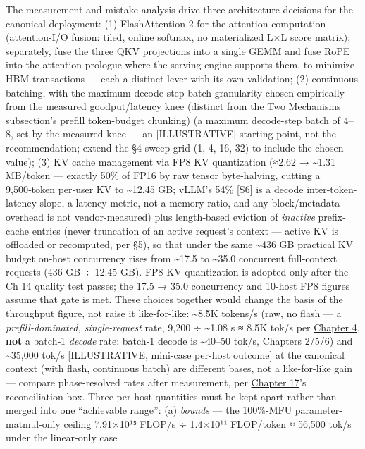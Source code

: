 The measurement and mistake analysis drive three architecture decisions
for the canonical deployment: (1) FlashAttention‑2 for the attention
computation (attention-I/O fusion: tiled, online softmax, no
materialized L×L score matrix); separately, fuse the three QKV
projections into a single GEMM and fuse RoPE into the attention prologue
where the serving engine supports them, to minimize HBM transactions ---
each a distinct lever with its own validation; (2) continuous batching,
with the maximum decode-step batch granularity chosen empirically from
the measured goodput/latency knee (distinct from the Two Mechanisms
subsection's prefill token-budget chunking) (a maximum decode-step batch
of 4--8, set by the measured knee --- an \mbox{{[}ILLUSTRATIVE{]}} starting
point, not the recommendation; extend the §4 sweep grid (1, 4, 16, 32)
to include the chosen value); (3) KV cache management via FP8 KV
quantization (≈2.62 → \textasciitilde1.31 MB/token --- exactly 50\% of
FP16 by raw tensor byte-halving, cutting a 9,500‑token per‑user KV to
\textasciitilde12.45 GB; vLLM's 54\% \mbox{{[}S6{]}} is a decode
inter-token-latency slope, a latency metric, not a memory ratio, and any
block/metadata overhead is not vendor-measured) plus length‑based
eviction of \emph{inactive} prefix-cache entries (never truncation of an
active request's context --- active KV is offloaded or recomputed, per
§5), so that under the same \textasciitilde436 GB practical KV budget
on‑host concurrency rises from \textasciitilde17.5 to
\textasciitilde35.0 concurrent full‑context requests (436 GB ÷ 12.45
GB). FP8 KV quantization is adopted only after the Ch 14 quality test
passes; the 17.5 → 35.0 concurrency and 10-host FP8 figures assume that
gate is met. These choices together would change the basis of the
throughput figure, not raise it like-for-like: \textasciitilde8.5K
tokens/s (raw, no flash --- a \emph{prefill-dominated, single-request}
rate, 9,200 ÷ \textasciitilde1.08 s ≈ 8.5K tok/s per \hyperref[chap:4]{Chapter 4},
\textbf{not} a batch‑1 \emph{decode} rate: batch‑1 decode is
\textasciitilde40--50 tok/s, Chapters 2/5/6) and \textasciitilde35,000
tok/s {[}ILLUSTRATIVE, mini-case per-host outcome{]} at the canonical
context (with flash, continuous batch) are different bases, not a
like-for-like gain --- compare phase-resolved rates after measurement,
per \hyperref[chap:17]{Chapter 17}'s reconciliation box. Three per-host quantities must be
kept apart rather than merged into one ``achievable range'': (a)
\emph{bounds} --- the 100\%-MFU parameter-matmul-only ceiling 7.91×10¹⁵
FLOP/s ÷ 1.4×10¹¹ FLOP/token ≈ 56,500 tok/s under the linear-only case
